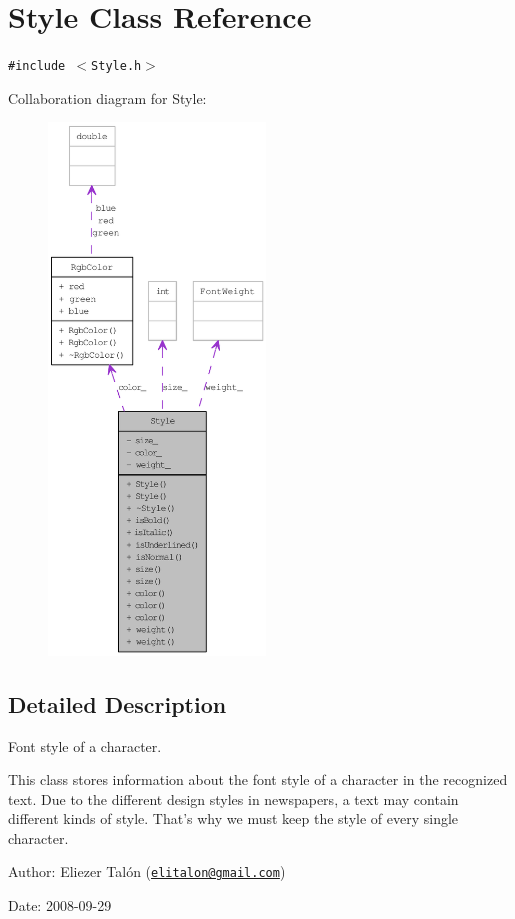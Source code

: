 \hypertarget{class_style}{
\section{Style Class Reference}
\label{class_style}
}
{\tt \#include $<$Style.h$>$}

Collaboration diagram for Style:\nopagebreak
\begin{figure}[H]
\begin{center}
\leavevmode
\includegraphics[height=400pt]{class_style__coll__graph}
\end{center}
\end{figure}


\subsection{Detailed Description}
Font style of a character. 

This class stores information about the font style of a character in the recognized text. Due to the different design styles in newspapers, a text may contain different kinds of style. That's why we must keep the style of every single character.

\begin{Desc}
\item[Author:]Eliezer Talón (\href{mailto:elitalon@gmail.com}{\tt elitalon@gmail.com}) \end{Desc}
\begin{Desc}
\item[Date:]2008-09-29 \end{Desc}


